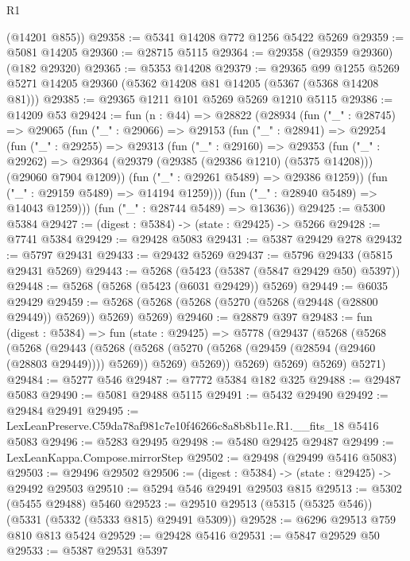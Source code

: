 \begin{lexlean}{R1}
\begin{coremodule}
      (@14201 @855))
@29358 := @5341 @14208 @772 @1256 @5422 @5269
@29359 := @5081 @14205
@29360 := @28715 @5115
@29364 := @29358 (@29359 @29360) (@182 @29320)
@29365 := @5353 @14208
@29379 := @29365
    @99
    @1255
    @5269
    @5271
    @14205
    @29360
    (@5362 @14208 @81 @14205 (@5367 (@5368 @14208 @81)))
@29385 := @29365 @1211 @101 @5269 @5269 @1210 @5115
@29386 := @14209 @53
@29424 := fun (n : @44) =>
  @28822
    (@28934
      (fun ("_" : @28745) =>
      @29065
        (fun ("_" : @29066) =>
        @29153
          (fun ("_" : @28941) =>
          @29254
            (fun ("_" : @29255) =>
            @29313
              (fun ("_" : @29160) =>
              @29353
                (fun ("_" : @29262) =>
                @29364 (@29379 (@29385 (@29386 @1210) (@5375 @14208))) (@29060 @7904 @1209))
                (fun ("_" : @29261 @5489) => @29386 @1259))
              (fun ("_" : @29159 @5489) => @14194 @1259)))
          (fun ("_" : @28940 @5489) => @14043 @1259)))
      (fun ("_" : @28744 @5489) => @13636))
@29425 := @5300 @5384
@29427 := (digest : @5384) -> (state : @29425) -> @5266
@29428 := @7741 @5384
@29429 := @29428 @5083
@29431 := @5387 @29429 @278
@29432 := @5797 @29431
@29433 := @29432 @5269
@29437 := @5796 @29433 (@5815 @29431 @5269)
@29443 := @5268 (@5423 (@5387 (@5847 @29429 @50) @5397))
@29448 := @5268 (@5268 (@5423 (@6031 @29429)) @5269)
@29449 := @6035 @29429
@29459 := @5268 (@5268 (@5268 (@5270 (@5268 (@29448 (@28800 @29449)) @5269)) @5269) @5269)
@29460 := @28879 @397
@29483 := fun (digest : @5384) =>
  fun (state : @29425) =>
  @5778
    (@29437
      (@5268
        (@5268
          (@5268
            (@29443
              (@5268
                (@5268 (@5270 (@5268 (@29459 (@28594 (@29460 (@28803 @29449)))) @5269)) @5269)
                @5269))
            @5269)
          @5269)
        @5269)
      @5271)
@29484 := @5277 @546
@29487 := @7772 @5384 @182 @325
@29488 := @29487 @5083
@29490 := @5081 @29488 @5115
@29491 := @5432 @29490
@29492 := @29484 @29491
@29495 := LexLeanPreserve.C59da78af981c7e10f46266c8a8b8b11e.R1.__fits_18 @5416 @5083
@29496 := @5283 @29495
@29498 := @5480 @29425 @29487
@29499 := LexLeanKappa.Compose.mirrorStep
@29502 := @29498 (@29499 @5416 @5083)
@29503 := @29496 @29502
@29506 := (digest : @5384) -> (state : @29425) -> @29492 @29503
@29510 := @5294 @546 @29491 @29503 @815
@29513 := @5302 (@5455 @29488) @5460
@29523 := @29510 @29513 (@5315 (@5325 @546)) (@5331 (@5332 (@5333 @815) @29491 @5309))
@29528 := @6296 @29513 @759 @810 @813 @5424
@29529 := @29428 @5416
@29531 := @5847 @29529 @50
@29533 := @5387 @29531 @5397

\end{coremodule}
\end{lexlean}
